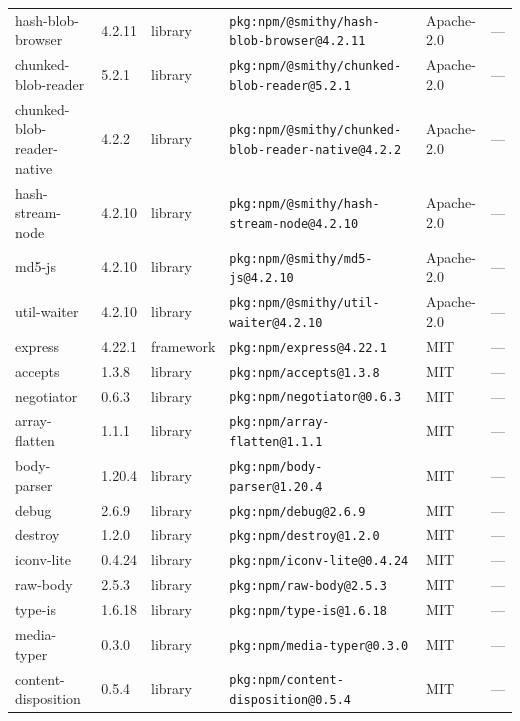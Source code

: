 \documentclass[11pt,a4paper]{article}
\begin{document}
\begin{longtable}{|p{4cm}|p{2cm}|p{1.6cm}|p{5cm}|p{1.5cm}|p{3.5cm}|}
\raggedright hash-blob-browser & 4.2.11 & library & \small\texttt{pkg:npm/@smithy/hash-blob-browser@4.2.11} & Apache-2.0 & \small — \\
\raggedright chunked-blob-reader & 5.2.1 & library & \small\texttt{pkg:npm/@smithy/chunked-blob-reader@5.2.1} & Apache-2.0 & \small — \\
\raggedright chunked-blob-reader-native & 4.2.2 & library & \small\texttt{pkg:npm/@smithy/chunked-blob-reader-native@4.2.2} & Apache-2.0 & \small — \\
\raggedright hash-stream-node & 4.2.10 & library & \small\texttt{pkg:npm/@smithy/hash-stream-node@4.2.10} & Apache-2.0 & \small — \\
\raggedright md5-js & 4.2.10 & library & \small\texttt{pkg:npm/@smithy/md5-js@4.2.10} & Apache-2.0 & \small — \\
\raggedright util-waiter & 4.2.10 & library & \small\texttt{pkg:npm/@smithy/util-waiter@4.2.10} & Apache-2.0 & \small — \\
\raggedright express & 4.22.1 & framework & \small\texttt{pkg:npm/express@4.22.1} & MIT & \small — \\
\raggedright accepts & 1.3.8 & library & \small\texttt{pkg:npm/accepts@1.3.8} & MIT & \small — \\
\raggedright negotiator & 0.6.3 & library & \small\texttt{pkg:npm/negotiator@0.6.3} & MIT & \small — \\
\raggedright array-flatten & 1.1.1 & library & \small\texttt{pkg:npm/array-flatten@1.1.1} & MIT & \small — \\
\raggedright body-parser & 1.20.4 & library & \small\texttt{pkg:npm/body-parser@1.20.4} & MIT & \small — \\
\raggedright debug & 2.6.9 & library & \small\texttt{pkg:npm/debug@2.6.9} & MIT & \small — \\
\raggedright destroy & 1.2.0 & library & \small\texttt{pkg:npm/destroy@1.2.0} & MIT & \small — \\
\raggedright iconv-lite & 0.4.24 & library & \small\texttt{pkg:npm/iconv-lite@0.4.24} & MIT & \small — \\
\raggedright raw-body & 2.5.3 & library & \small\texttt{pkg:npm/raw-body@2.5.3} & MIT & \small — \\
\raggedright type-is & 1.6.18 & library & \small\texttt{pkg:npm/type-is@1.6.18} & MIT & \small — \\
\raggedright media-typer & 0.3.0 & library & \small\texttt{pkg:npm/media-typer@0.3.0} & MIT & \small — \\
\raggedright content-disposition & 0.5.4 & library & \small\texttt{pkg:npm/content-disposition@0.5.4} & MIT & \small — \\

\end{longtable}
\end{document}
